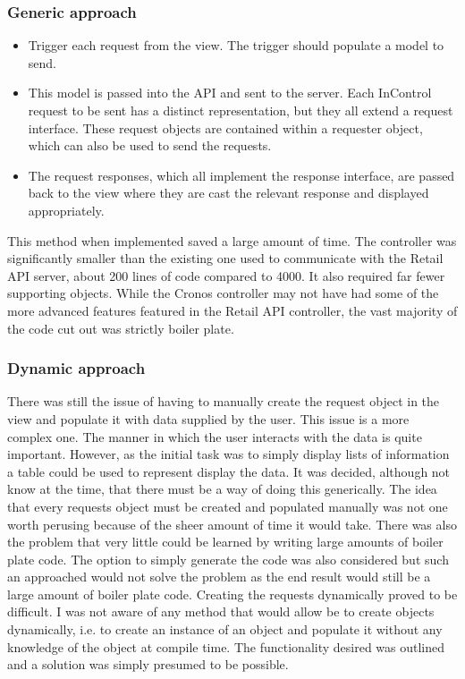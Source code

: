 \documentclass[a4paper, 11pt, titlepage]{article}
\begin{document}
\subsubsection{Generic approach} 
\begin{itemize} 
\item Trigger each request from the view. The trigger should populate a model to send. \label{cronos_generic_api} 
\item This model is passed into the API and sent to the server. Each InControl request to be sent has a distinct representation, but they all extend a request interface. These request objects are contained within a requester object, which can also be used to send the requests. 
\item The request responses, which all implement the response interface, are passed back to the view where they are cast the relevant response and displayed appropriately. 
\end{itemize} 
This method when implemented saved a large amount of time. The controller was significantly smaller than the existing one used to communicate with the Retail API server, about 200 lines of code compared to 4000. It also required far fewer supporting objects. While the Cronos controller may not have had some of the more advanced features featured in the Retail API controller, the vast majority of the code cut out was strictly boiler plate. 
\subsubsection{Dynamic approach} \label{dynamic_smart}
There was still the issue of having to manually create the request object in the view and populate it with data supplied by the user. This issue is a more complex one. The manner in which the user interacts with the data is quite important. However, as the initial task was to simply display lists of information a table could be used to represent display the data. It was decided, although not know at the time, that there must be a way of doing this generically. The idea that every requests object must be created and populated manually was not one worth perusing because of the sheer amount of time it would take. There was also the problem that very little could be learned by writing large amounts of boiler plate code. The option to simply generate the code was also considered but such an approached would not solve the problem as the end result would still be a large amount of boiler plate code. Creating the requests dynamically proved to be difficult. I was not aware of any method that would allow be to create objects dynamically, i.e. to create an instance of an object and populate it without any knowledge of the object at compile time. The functionality desired was outlined and a solution was simply presumed to be possible.  
\end{document}
